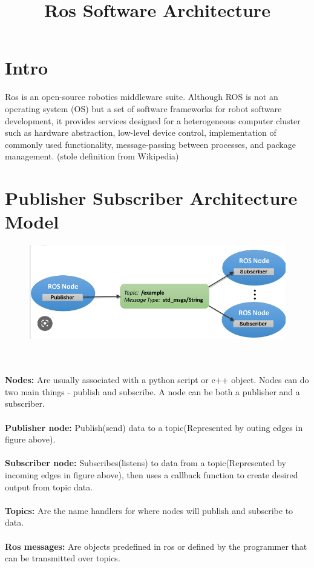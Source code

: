 \documentclass{article}
\title{Ros Software Architecture}
\author{}
\date{}
\begin{document}
\maketitle
{}
\section{Intro}
Ros is an open-source robotics middleware suite. Although ROS is not an operating system (OS) but a set of software frameworks for robot software development, it provides services designed for a heterogeneous computer cluster such as hardware abstraction, low-level device control, implementation of commonly used functionality, message-passing between processes, and package management. (stole definition from Wikipedia)

\section{Publisher Subscriber Architecture Model}
\begin{figure}[htp]
    \centering
    \includegraphics[width=12cm]{pubsub.png}
    \caption{}
    \label{fig:pubsub}
\end{figure}\\\\
\textbf{Nodes:} Are usually associated with a python script or c++ object. Nodes can do two main things - publish and subscribe. A node can be both a publisher and a subscriber.\\\\
\textbf{Publisher node: } Publish(send) data to a topic(Represented by outing edges in figure above). \\\\
\textbf{Subscriber node: } Subscribes(listens) to data from a topic(Represented by incoming edges in figure above), then uses a callback function to create desired output from topic data. \\\\
\textbf{Topics: } Are the name handlers for where nodes will publish and subscribe to data.\\\\
\textbf{Ros messages: } Are objects predefined in ros or defined by the programmer that can be transmitted over topics. 
\end{document}
